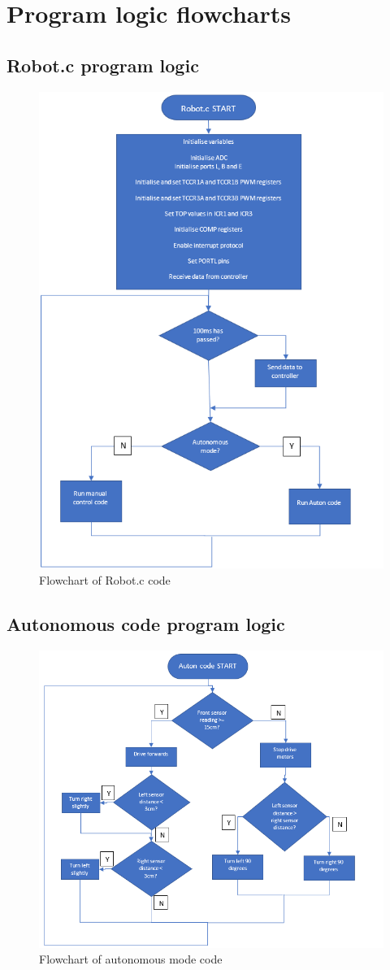 \documentclass[12pt, a4paper]{article}
\begin{document}
  
\newpage
  
    \section{Program logic flowcharts} \label{sec:Flowchart}
      \subsection{Robot.c program logic}
        \begin{figure}[h]
          \includegraphics[width=0.6\columnwidth]{Images/robot_c.png}
          \centering
          \caption{Flowchart of Robot.c code}
          \label{fig:Flowchart:robot_c}
        \end{figure}
  
      \subsection{Autonomous code program logic}
        \begin{figure}[h]
          \includegraphics[width=0.6\columnwidth]{Images/auton.png}
          \centering
          \caption{Flowchart of autonomous mode code}
          \label{fig:Flowchart:auton}
        \end{figure}
\end{document}
